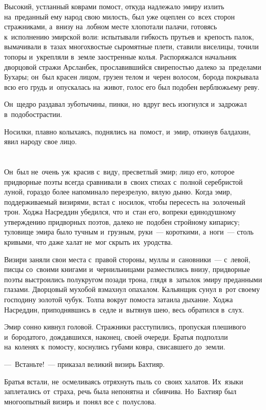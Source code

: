 \documentclass[12pt,a4paper]{book}
\begin{document}
Высокий, устланный коврами помост, откуда надлежало эмиру излить на~преданный ему народ свою милость, был уже оцеплен со~всех сторон стражниками, а~внизу на~лобном месте хлопотали палачи, готовясь к~исполнению эмирской воли: испытывали гибкость прутьев и~крепость палок, вымачивали в~тазах многохвостые сыромятные плети, ставили виселицы, точили топоры и~укрепляли в~земле заостренные колья. Распоряжался начальник дворцовой стражи Арсланбек, прославившийся свирепостью далеко за~пределами Бухары; он~был красен лицом, грузен телом и~черен волосом, борода покрывала всю его грудь и~опускалась на~живот, голос его был подобен верблюжьему реву.

Он~щедро раздавал зуботычины, пинки, но~вдруг весь изогнулся и~задрожал в~подобострастии.

Носилки, плавно колыхаясь, поднялись на~помост, и~эмир, откинув балдахин, явил народу свое лицо.


\chapter{}

Он~был не~очень уж~красив с~виду, пресветлый эмир; лицо его, которое придворные поэты всегда сравнивали в~своих стихах с~полной серебристой луной, гораздо более напоминало перезрелую, вялую дыню. Когда эмир, поддерживаемый визирями, встал с~носилок, чтобы пересесть на~золоченый трон. Ходжа Насреддин убедился, что и~стан его, вопреки единодушному утверждению придворных поэтов, далеко не~подобен стройному кипарису; туловище эмира было тучным и~грузным, руки~— короткими, а~ноги~— столь кривыми, что даже халат не~мог скрыть их~уродства.

Визири заняли свои места с~правой стороны, муллы и~сановники~— с~левой, писцы со~своими книгами и~чернильницами разместились внизу, придворные поэты выстроились полукругом позади трона, глядя в~затылок эмиру преданными глазами. Дворцовый мухобой взмахнул опахалом. Кальянщик сунул в~рот своему господину золотой чубук. Толпа вокруг помоста затаила дыхание. Ходжа Насреддин, приподнявшись в~седле и~вытянув шею, весь обратился в~слух.

Эмир сонно кивнул головой. Стражники расступились, пропуская плешивого и~бородатого, дождавшихся, наконец, своей очереди. Братья подползли на~коленях к~помосту, коснулись губами ковра, свисавшего до~земли.

—~Встаньте!~— приказал великий визирь Бахтияр.

Братья встали, не~осмеливаясь отряхнуть пыль со~своих халатов. Их~языки заплетались от~страха, речь была непонятна и~сбивчива. Но~Бахтияр был многоопытный визирь и~понял все с~полуслова.
\end{document}

